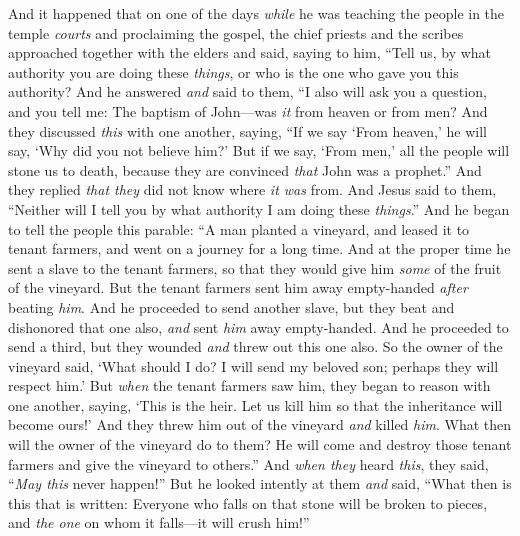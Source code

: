 \begin{biblechapter} %
 And it happened that on one of the days \textit{while} he was teaching the people in the temple \textit{courts} and proclaiming the gospel, the chief priests and the scribes approached together with the elders
\verse and said, saying to him, “Tell us, by what authority you are doing these \textit{things}, or who is the one who gave you this authority?
\verse And he answered \textit{and} said to them, “I also will ask you a question, and you tell me:
\verse The baptism of John—was \textit{it} from heaven or from men?
\verse And they discussed \textit{this} with one another, saying, “If we say ‘From heaven,’ he will say, ‘Why did you not believe him?’
\verse But if we say, ‘From men,’ all the people will stone us to death, because they are convinced \textit{that} John was a prophet.”
\verse And they replied \textit{that they} did not know where \textit{it was} from.
\verse And Jesus said to them, “Neither will I tell you by what authority I am doing these \textit{things}.”
 And he began to tell the people this parable: “A man planted a vineyard, and leased it to tenant farmers, and went on a journey for a long time.
\verse And at the proper time he sent a slave to the tenant farmers, so that they would give him \textit{some} of the fruit of the vineyard. But the tenant farmers sent him away empty-handed \textit{after} beating \textit{him}.
\verse And he proceeded to send another slave, but they beat and dishonored that one also, \textit{and} sent \textit{him} away empty-handed.
\verse And he proceeded to send a third, but they wounded \textit{and} threw out this one also.
\verse So the owner of the vineyard said, ‘What should I do? I will send my beloved son; perhaps they will respect him.’
\verse But \textit{when} the tenant farmers saw him, they began to reason with one another, saying, ‘This is the heir. Let us kill him so that the inheritance will become ours!’
\verse And they threw him out of the vineyard \textit{and} killed \textit{him}. What then will the owner of the vineyard do to them?
\verse He will come and destroy those tenant farmers and give the vineyard to others.” And \textit{when they} heard \textit{this}, they said, “\textit{May this} never happen!”
\verse But he looked intently at them \textit{and} said, “What then is this that is written:
\verse Everyone who falls on that stone will be broken to pieces, and \textit{the one} on whom it falls—it will crush him!”

\end{biblechapter}
